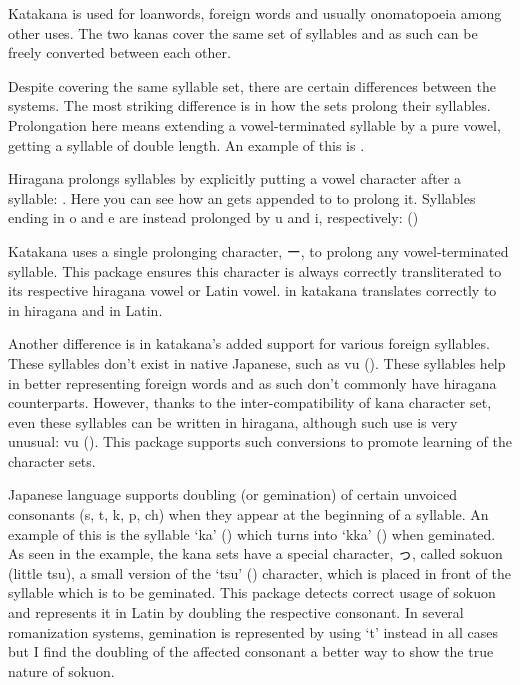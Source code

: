 Katakana is used for loanwords, foreign words and usually onomatopoeia among other uses.
The two kanas cover the same set of syllables and as such can be freely converted between each other.


Despite covering the same syllable set, there are certain differences between the systems.
The most striking difference is in how the sets prolong their syllables.
Prolongation here means extending a vowel-terminated syllable by a pure vowel, getting a syllable of double length. An example of this is .

Hiragana prolongs syllables by explicitly putting a vowel character after a syllable: .\break
Here you can see how an  gets appended to  to prolong it.
Syllables ending in o and e are instead prolonged by u and i, respectively:  ()

Katakana uses a single prolonging character, \jchar ー, to prolong any vowel-terminated syllable.
This package ensures this character is always correctly transliterated to its respective hiragana vowel or Latin vowel.\break
{} in katakana translates correctly to  in hiragana and  in Latin.

Another difference is in katakana's added support for various foreign syllables. These syllables don't exist in native Japanese, such as vu ().
These syllables help in better representing foreign words and as such don't commonly have hiragana counterparts.
However, thanks to the inter-compatibility of kana character set, even these syllables can be written in hiragana, although such use is very unusual: vu ().
This package supports such conversions to promote learning of the character sets.


Japanese language supports doubling (or gemination) of certain unvoiced consonants (s, t, k, p, ch) when they appear at the beginning of a syllable. An example of this is the syllable `ka' () which turns into `kka' () when geminated. As seen in the example, the kana sets have a special character, \jchar っ, called sokuon (little tsu), a small version of the `tsu' () character, which is placed in front of the syllable which is to be geminated.
This package detects correct usage of sokuon and represents it in Latin by doubling the respective consonant.
In several romanization systems, gemination is represented by using `t' instead in all cases but I find the doubling of the affected consonant a better way to show the true nature of sokuon.

